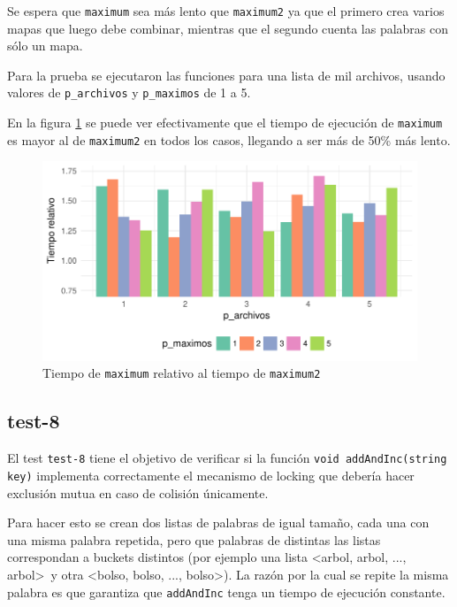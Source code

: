 Se espera que \texttt{maximum} sea más lento que \texttt{maximum2} ya que el primero crea varios mapas que luego debe combinar, mientras que el segundo cuenta las palabras con sólo un mapa.

Para la prueba se ejecutaron las funciones para una lista de mil archivos, usando valores de \texttt{p\_archivos} y \texttt{p\_maximos} de 1 a 5.

En la figura \ref{fig:test_tiempos} se puede ver efectivamente que el tiempo de ejecución de \texttt{maximum} es mayor al de \texttt{maximum2} en todos los casos, llegando a ser más de 50\% más lento.

\begin{figure}[!h]
\includegraphics{figuras/tiempos.pdf}
\caption{Tiempo de \texttt{maximum} relativo al tiempo de \texttt{maximum2}}
\label{fig:test_tiempos}
\end{figure}


\subsection{test-8}

El test \texttt{test-8} tiene el objetivo de verificar si la función \texttt{void addAndInc(string key)} implementa correctamente el mecanismo de locking que debería hacer exclusión mutua en caso de colisión únicamente.

Para hacer esto se crean dos listas de palabras de igual tamaño, cada una con una misma palabra repetida, pero que palabras de distintas las listas correspondan a buckets distintos (por ejemplo una lista \textless arbol, arbol, ..., arbol\textgreater\ y otra \textless bolso, bolso, ..., bolso\textgreater ). La razón por la cual se repite la misma palabra es que garantiza que \texttt{addAndInc} tenga un tiempo de ejecución constante.

